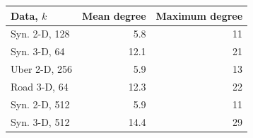 \begin{tabular}{lrr}
\toprule
Data, $k$ & Mean degree & Maximum degree \\
\midrule
Syn. 2-D, 128 & 5.8 & 11 \\
Syn. 3-D, 64 & 12.1 & 21 \\
Uber 2-D, 256 & 5.9 & 13 \\
Road 3-D, 64 & 12.3 & 22 \\
Syn. 2-D, 512 & 5.9 & 11 \\
Syn. 3-D, 512 & 14.4 & 29 \\
\bottomrule
\end{tabular}
